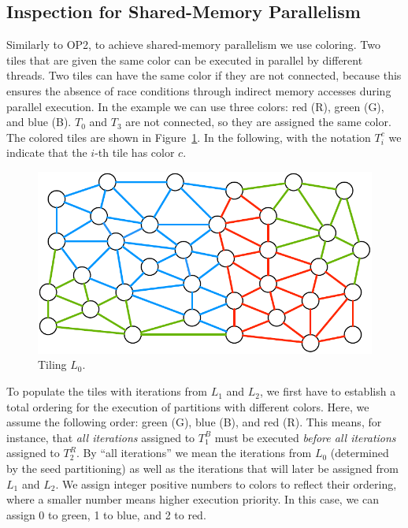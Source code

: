 \subsection*{Inspection for Shared-Memory Parallelism}
\label{sec:tiling:ex-sm}
Similarly to OP2, to achieve shared-memory parallelism we use coloring. Two tiles that are given the same color can be executed in parallel by different threads. Two tiles can have the same color if they are not connected, because this ensures the absence of race conditions through indirect memory accesses during parallel execution. In the example we can use three colors: red (R), green (G), and blue (B). $T_0$ and $T_3$ are not connected, so they are assigned the same color. The colored tiles are shown in Figure~\ref{fig:st-loop-0}. In the following, with the notation $T_i^c$ we indicate that the $i$-th tile has color $c$. 

\begin{figure}[b]
\centering
\includegraphics[scale=0.7]{sparsetiling/figures/loop_0.pdf}
\caption{Tiling $L_0$.}
\label{fig:st-loop-0}
\end{figure}

To populate the tiles with iterations from $L_1$ and $L_2$, we first have to establish a total ordering for the execution of partitions with different colors. Here, we assume the following order: green (G), blue (B), and red (R). This means, for instance, that \textit{all iterations} assigned to $T_1^B$ must be executed \textit{before all iterations} assigned to $T_2^R$. By ``all iterations'' we mean the iterations from $L_0$ (determined by the seed partitioning) as well as the iterations that will later be assigned from $L_1$ and $L_2$. We assign integer positive numbers to colors to reflect their ordering, where a smaller number means higher execution priority. In this case, we can assign 0 to green, 1 to blue, and 2 to red.


